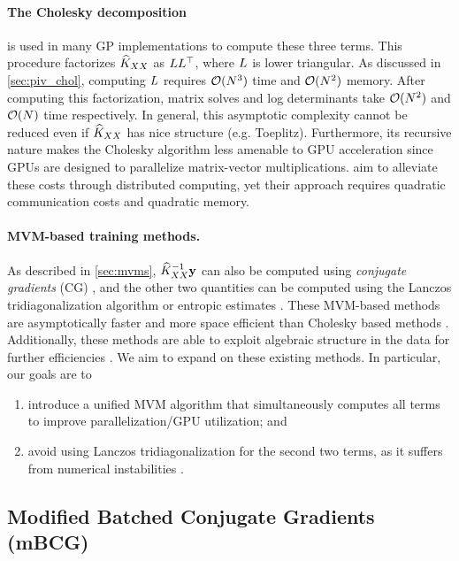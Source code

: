 \paragraph{The Cholesky decomposition} is used in many GP implementations to compute these three terms.
This procedure factorizes $\widehat{K}_{XX}$ as $L L^\top$, where $L$ is lower triangular.
As discussed in \cref{sec:piv_chol}, computing $L$ requires $\bigo{N^3}$ time and $\bigo{N^2}$ memory.
After computing this factorization, matrix solves and log determinants take $\bigo{N^2}$ and $\bigo{N}$ time respectively.
In general, this asymptotic complexity cannot be reduced even if $\widehat{K}_{XX}$ has nice structure (e.g. Toeplitz).
Furthermore, its recursive nature makes the Cholesky algorithm less amenable to GPU acceleration since GPUs are designed to parallelize matrix-vector multiplications.
\citet{nguyen2019exact} aim to alleviate these costs through distributed computing, yet their approach requires quadratic communication costs and quadratic memory.

\paragraph{MVM-based training methods.}
As described in \cref{sec:mvms},
$\widehat{K}_{XX}^{-1}\mathbf{y}$ can also be computed using \emph{conjugate gradients} (CG) \cite{cunningham2008fast,cutajar2016preconditioning},
and the other two quantities can be computed using the Lanczos tridiagonalization algorithm \cite{ubaru2017fast,dong2017scalable} or entropic estimates \cite{fitzsimons2016improved}.
These MVM-based methods are asymptotically faster and more space efficient than Cholesky based methods \cite{wilson2015kernel,dong2017scalable}.
Additionally, these methods are able to exploit algebraic structure in the data for further efficiencies \cite{cunningham2008fast,saatcci2012scalable,wilson2015kernel}.
We aim to expand on these existing methods.
In particular, our goals are to
\begin{enumerate}
  \item introduce a unified MVM algorithm that simultaneously computes all terms to improve parallelization/GPU utilization; and
  \item avoid using Lanczos tridiagonalization for the second two terms, as it suffers from numerical instabilities \cite{golub2012matrix}.
\end{enumerate}

\subsection{Modified Batched Conjugate Gradients (mBCG)}
\label{sec:mbcg}


